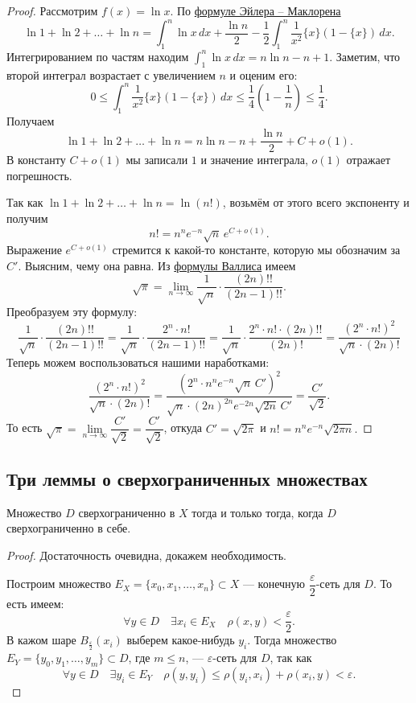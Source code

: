 \begin{proof}
	Рассмотрим \(f(x) = \ln x\). По \hyperlink{eumak}{формуле Эйлера -- Маклорена} \[
	\ln 1 + \ln 2 + \ldots + \ln n = \int_1^n \ln x \, dx + \frac{\ln n}{2} - \frac{1}{2} \int_1^n \frac{1}{x^2} \{x\} (1 - \{x\}) \, dx.
	\]
	Интегрированием по частям находим \(\displaystyle\int_1^n \ln x \, dx = n \ln n - n + 1\). Заметим, что второй интеграл возрастает с увеличением \(n\) и оценим его: \[
	0 \leqslant \int_1^n \frac{1}{x^2} \{x\} (1 - \{x\}) \, dx \leqslant \frac{1}{4} \left(1 - \frac{1}{n} \right) \leqslant \frac{1}{4}.
	\]
	Получаем \[
	\ln 1 + \ln 2 + \ldots + \ln n = n \ln n - n + \frac{\ln n}{2} + C + o(1).
	\]
	В константу \(C + o(1)\) мы записали \(1\) и значение интеграла, \(o(1)\) отражает погрешность.
	
	Так как \(\ln 1 + \ln 2 + \ldots + \ln n = \ln(n!)\), возьмём от этого всего экспоненту и получим \[
	n! = n^n e^{-n} \sqrt{n} \, e^{C + o(1)}.
	\]
	Выражение \(e^{C + o(1)}\) стремится к какой-то константе, которую мы обозначим за \(C'\). Выясним, чему она равна. Из \hyperlink{wall}{формулы Валлиса} имеем \[
	\sqrt{\pi} = \lim_{n \to \infty} \frac{1}{\sqrt{n}} \cdot \frac{(2n)!!}{(2n - 1)!!}.
	\]
	Преобразуем эту формулу: \[
	\frac{1}{\sqrt{n}} \cdot \frac{(2n)!!}{(2n - 1)!!} = \frac{1}{\sqrt{n}} \cdot \frac{2^n \cdot n!}{(2n - 1)!!} = \frac{1}{\sqrt{n}} \cdot \frac{2^n \cdot n! \cdot (2n)!!}{(2n)!} = \frac{(2^n \cdot n!)^2}{\sqrt{n} \cdot (2n)!}
	\]
	Теперь можем воспользоваться нашими наработками: \[
	\frac{(2^n \cdot n!)^2}{\sqrt{n} \cdot (2n)!} = \frac{(2^n \cdot n^n e^{-n} \sqrt{n} \, C')^2}{\sqrt{n} \cdot (2n)^{2n} e^{-2n} \sqrt{2n} \, C'} = \frac{C'}{\sqrt{2}}.
	\]
	То есть \(\sqrt{\pi} = \lim\limits_{n \to \infty} \dfrac{C'}{\sqrt{2}} = \dfrac{C'}{\sqrt{2}}\), откуда \(C' = \sqrt{2\pi}\) и \(n! = n^n e^{-n} \sqrt{2\pi n}.\) 
	
\end{proof}

\subsection{Три леммы о сверхограниченных множествах}

\begin{lemma}
	Множество \(D\) сверхограниченно в \(X\) тогда и только тогда, когда \(D\) сверхограниченно в себе.
\end{lemma}

\begin{proof}
	Достаточность очевидна, докажем необходимость.
	
	Построим множество \(E_X = \{x_0, x_1,\ldots, x_n\} \subset X\) --- конечную \(\dfrac{\varepsilon}{2}\)-сеть для \(D\). То есть имеем: \[
	\forall y \in D \quad \exists x_i \in E_X \quad \rho(x, y) < \frac{\varepsilon}{2}.
	\]
	В кажом шаре \(B_{\frac{\varepsilon}{2}} (x_i)\) выберем какое-нибудь \(y_i\). Тогда множество \linebreak \(E_Y = \{y_0, y_1,\ldots, y_m\} \subset D\), где \(m \leqslant n\), --- \(\varepsilon\)-сеть для \(D\), так как \[
	\forall y \in D \quad \exists y_i \in E_Y \quad \rho(y, y_i) \leqslant \rho(y_i, x_i) + \rho(x_i, y) < \varepsilon.
	\]
\end{proof}

